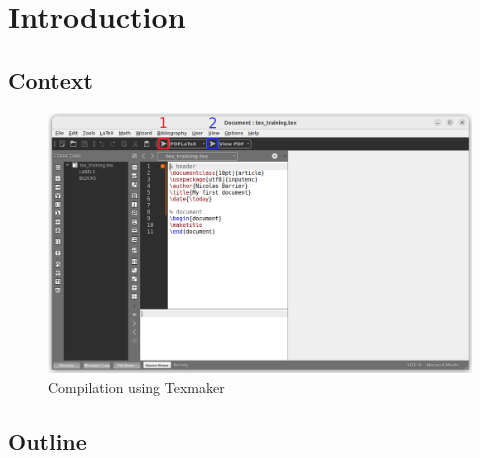 \chapter{Introduction}
\minitoc

\lipsum
\section{Context}
\lipsum

\begin{figure}[h!]
    \centering
    \includegraphics[width=0.5\linewidth]{figs/texmaker-1.png}
    \caption{Compilation using Texmaker}
\end{figure}

\section{Outline}